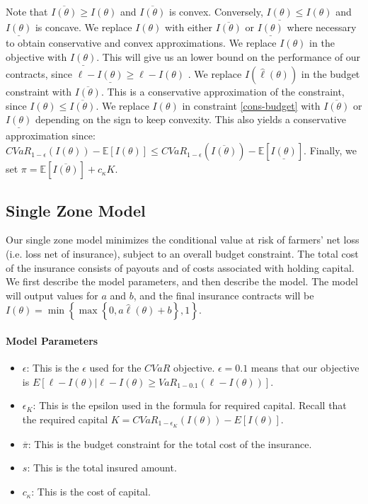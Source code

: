 \documentclass[11pt]{article}
\begin{document}
  Note that $\overline{I(\theta)} \geq I(\theta)$ and $\overline{I(\theta)}$ is convex. Conversely, $\underline{I(\theta)} \leq I(\theta)$ and $\underline{I(\theta)}$ is concave. We replace $I(\theta)$ with either $\overline{I(\theta)}$ or $\underline{I(\theta)}$ where necessary to obtain conservative and convex approximations. We replace $I(\theta)$ in the objective with $\underline{I(\theta)}$. This will give us an lower bound on the performance of our contracts, since $\ell - \underline{I(\theta)} \geq  \ell - I(\theta)$ . We replace $I(\hat{\ell}(\theta))$ in the budget constraint with $\overline{I(\theta)}$. This is a conservative approximation of the constraint, since $I(\theta)  \leq \overline{I(\theta)}$. We replace $I(\theta)$ in constraint \ref{cons-budget} with $\overline{I(\theta)}$ or $\underline{I(\theta)}$ depending on the sign to keep convexity. This also yields a conservative approximation since: $CVaR_{1-\epsilon}\left ( I(\theta) \right )  - \mathbb{E}[I(\theta)]  \leq CVaR_{1-\epsilon}\left ( \overline{I(\theta)} \right )  - \mathbb{E}[ \underline{I(\theta) }]$. Finally, we set $\pi = \mathbb{E}\left [ \overline{ I(\theta)} \right ] + c_{\kappa} K$.
  
  \subsection{Single Zone Model}
  Our single zone model minimizes the conditional value at risk of farmers' net loss (i.e. loss net of insurance), subject to an overall budget constraint. The total cost of the insurance consists of payouts and of costs associated with holding capital. We first describe the model parameters, and then describe the model. The model will output values for $a$ and $b$, and the final insurance contracts will be $I(\theta) = \min \left \{\max \left \{0,a\hat{\ell}(\theta) + b \right \}, 1 \right \}$.
  \paragraph*{Model Parameters}
  \begin{itemize}
    \item $\epsilon$: This is the $\epsilon$ used for the $CVaR$ objective.  $\epsilon = 0.1$ means that our objective is $E[\ell - I(\theta)|\ell -I(\theta) \geq VaR_{1-0.1}\left ( \ell - I(\theta) \right )]$. 
    \item $\epsilon_K$: This is the epsilon used in the formula for required capital. Recall that the required capital $K = CVaR_{1-\epsilon_K}(I(\theta)) - E[I(\theta)]$.
    \item $\overline{\pi}$: This is the budget constraint for the total cost of the insurance. 
    \item $s$: This is the total insured amount.
    \item $c_{\kappa}$: This is the cost of capital. 
\end{itemize}
  
\end{document}
